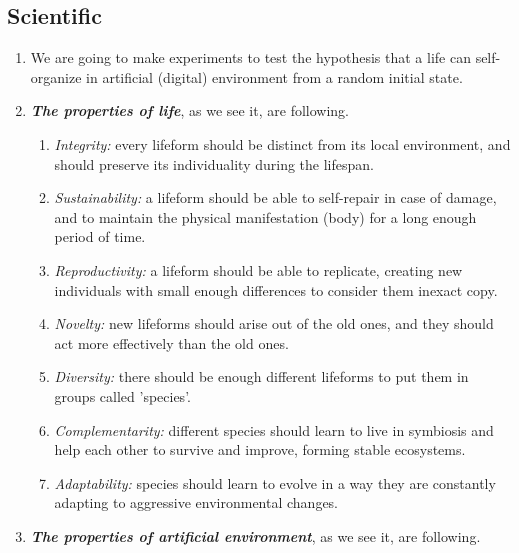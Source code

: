 \documentclass[a4paper,12pt,tikz,UTF8]{article}
\begin{document}
  \subsection{Scientific}
  \label{subsec:manifest-scientific}
  \begin{enumerate}

    \item We are going to make experiments to test the hypothesis that a life can self-organize in artificial (digital) environment from a random initial state.

    \item \textbf{\textit{The properties of life}}, as we see it, are following.
      \begin{enumerate}
        \item \textit{Integrity:} every lifeform should be distinct from its local environment, and should preserve its individuality during the lifespan.
        \item \textit{Sustainability:} a lifeform should be able to self-repair in case of damage, and to maintain the physical manifestation (body) for a long enough period of time.
        \item \textit{Reproductivity:} a lifeform should be able to replicate, creating new individuals with small enough differences to consider them inexact copy.
        \item \textit{Novelty:} new lifeforms should arise out of the old ones, and they should act more effectively than the old ones. 
        \item \textit{Diversity:} there should be enough different lifeforms to put them in groups called 'species'.
        \item \textit{Complementarity:} different species should learn to live in symbiosis and help each other to survive and improve, forming stable ecosystems.
        \item \textit{Adaptability:} species should learn to evolve in a way they are constantly adapting to aggressive environmental changes.
      \end{enumerate}

    \item \textbf{\textit{The properties of artificial environment}}, as we see it, are following.
      \begin{enumerate}


\end{enumerate}
\end{enumerate}
\end{document}
